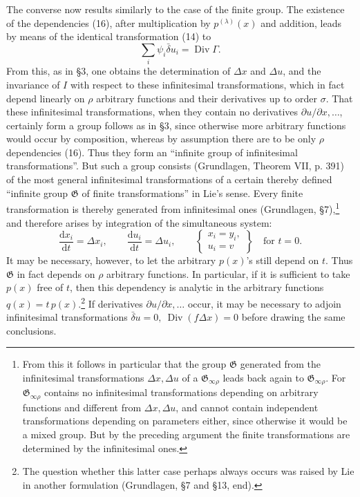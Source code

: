 \documentclass[11pt]{article}
\newcommand{\D}{\Delta}
\providecommand{\dd}{\mathrm d}
\providecommand{\Div}{\operatorname{Div}}
\providecommand{\G}{\mathfrak G}
\providecommand{\bd}{\bar{\delta}}
\providecommand{\p}{\partial}
\providecommand{\p}{\partial}
\providecommand{\dd}{\mathrm d}
\begin{document}
The converse now results similarly to the case of the finite group. The existence of the dependencies (16), after multiplication by \(p^{(\lambda)}(x)\) and addition, leads by means of the identical transformation (14) to
\[
\sum_i\psi_i\bd u_i=\Div\Gamma.
\]
From this, as in \S{}3, one obtains the determination of \(\D x\) and \(\D u\), and the invariance of \(I\) with respect to these infinitesimal transformations, which in fact depend linearly on \(\rho\) arbitrary functions and their derivatives up to order \(\sigma\). That these infinitesimal transformations, when they contain no derivatives \(\p u/\p x,\ldots\), certainly form a group follows as in \S{}3, since otherwise more arbitrary functions would occur by composition, whereas by assumption there are to be only \(\rho\) dependencies (16). Thus they form an ``infinite group of infinitesimal transformations''. But such a group consists (Grundlagen, Theorem VII, p. 391) of the most general infinitesimal transformations of a certain thereby defined ``infinite group \(\G\) of finite transformations'' in Lie's sense. Every finite transformation is thereby generated from infinitesimal ones (Grundlagen, \S{}7),\footnote{From this it follows in particular that the group \(\G\) generated from the infinitesimal transformations \(\D x,\D u\) of a \(\G_{\infty\rho}\) leads back again to \(\G_{\infty\rho}\). For \(\G_{\infty\rho}\) contains no infinitesimal transformations depending on arbitrary functions and different from \(\D x,\D u\), and cannot contain independent transformations depending on parameters either, since otherwise it would be a mixed group. But by the preceding argument the finite transformations are determined by the infinitesimal ones.} and therefore arises by integration of the simultaneous system:
\[
\frac{\dd x_i}{\dd t}=\D x_i,\qquad
\frac{\dd u_i}{\dd t}=\D u_i,\qquad
\left\{\begin{array}{l}
x_i=y_i,\\
u_i=v
\end{array}\right\}
\quad\text{for }t=0.
\]
It may be necessary, however, to let the arbitrary \(p(x)\)'s still depend on \(t\). Thus \(\G\) in fact depends on \(\rho\) arbitrary functions. In particular, if it is sufficient to take \(p(x)\) free of \(t\), then this dependency is analytic in the arbitrary functions \(q(x)=t\,p(x)\).\footnote{The question whether this latter case perhaps always occurs was raised by Lie in another formulation (Grundlagen, \S{}7 and \S{}13, end).} If derivatives \(\p u/\p x,\ldots\) occur, it may be necessary to adjoin infinitesimal transformations \(\bd u=0,\ \Div(f\D x)=0\) before drawing the same conclusions.
\end{document}
